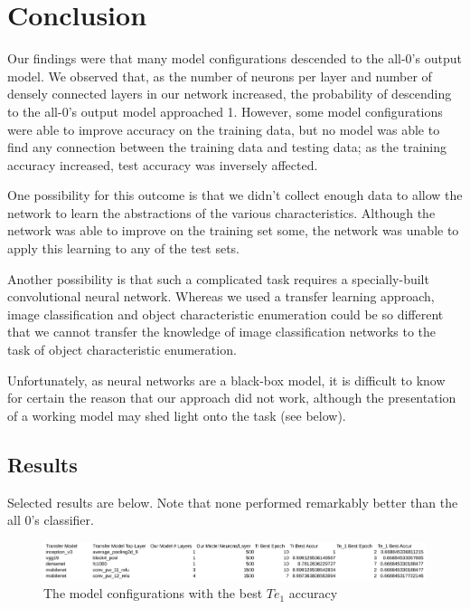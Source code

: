 \documentclass{article}
\begin{document}
\section{Conclusion}

Our findings were that many model configurations descended to the all-0's output model. We observed that, as the number of neurons per layer and number of densely connected layers in our network increased, the probability of descending to the all-0's output model approached 1. However, some model configurations were able to improve accuracy on the training data, but no model was able to find any connection between the training data and testing data; as the training accuracy increased, test accuracy was inversely affected.

One possibility for this outcome is that we didn't collect enough data to allow the network to learn the abstractions of the various characteristics. Although the network was able to improve on the training set some, the network was unable to apply this learning to any of the test sets.

Another possibility is that such a complicated task requires a specially-built convolutional neural network. Whereas we used a transfer learning approach, image classification and object characteristic enumeration could be so different that we cannot transfer the knowledge of image classification networks to the task of object characteristic enumeration.

Unfortunately, as neural networks are a black-box model, it is difficult to know for certain the reason that our approach did not work, although the presentation of a working model may shed light onto the task (see below).

\subsection{Results}

Selected results are below. Note that none performed remarkably better than the all 0's classifier.

\begin{figure}[h!]
	\centering
	\includegraphics[width=160mm]{results_te_1.png}
	\caption{The model configurations with the best $ Te_1 $ accuracy}
\end{figure}
\end{document}
